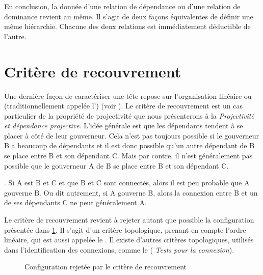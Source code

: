 {    En conclusion, la donnée d’une relation de dépendance ou d’une relation de dominance revient au même. Il s’agit de deux façons équivalentes de définir une même hiérarchie. Chacune des deux relations est immédiatement déductible de l’autre.
}

\section{Critère de recouvrement}\label{sec:3.3.32}

Une dernière façon de caractériser une tête repose sur l’organisation linéaire ou  (traditionnellement appelée l’) (voir ). Le critère de recouvrement est un cas particulier de la propriété de projectivité que nous présenterons à la  \textit{Projectivité et dépendance projective}. L’idée générale est que les dépendants tendent à se placer à côté de leur gouverneur. Cela n’est pas toujours possible si le gouverneur B a beaucoup de dépendants et il est donc possible qu’un autre dépendant de B se place entre B et son dépendant C. Mais par contre, il n’est généralement pas possible que le gouverneur A de B se place entre B et son dépendant C.

{. Si A est  B et C et que B et C sont connectés, alors il est peu probable que A gouverne B. Ou dit autrement, si A gouverne B, alors la connexion entre B et un de ses dépendants C ne peut généralement  A.}

Le critère de recouvrement revient à rejeter autant que possible la configuration présentée dans \ref{fig:recouvrement}. Il s'agit d'un critère topologique, prenant en compte l'ordre linéaire, 
qui est aussi appelée le . Il existe d'autres critères topologiques, utilisés dans l'identification des connexions, comme le  ( \textit{Tests pour la connexion}).

\begin{figure}
\caption{\label{fig:recouvrement}Configuration rejetée par le critère de recouvrement}
\end{figure}

